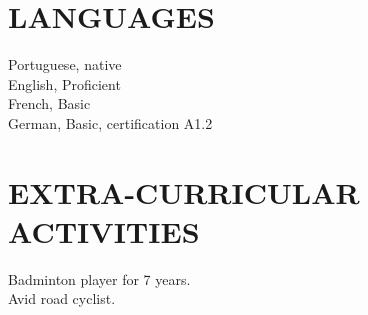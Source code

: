 \documentclass[margin, 10pt]{res} %
\begin{document}
\begin{resume}
    \section{LANGUAGES}
    Portuguese, native\\
    English, Proficient\\
    French, Basic\\
    German, Basic, certification A1.2


    \section{EXTRA-CURRICULAR \\ ACTIVITIES}
    Badminton player for 7 years.\\
    Avid road cyclist.


\end{resume}
\end{document}
